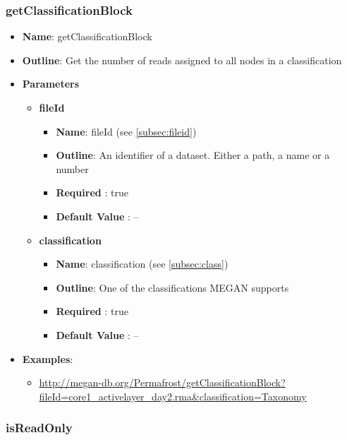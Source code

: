 \documentclass[11pt]{article}
\begin{document}
\subsubsection{getClassificationBlock}

\begin{itemize}
	\item \textbf{Name}: getClassificationBlock
	\item \textbf{Outline}: Get the number of reads assigned to all nodes in a classification
	\item \textbf{Parameters}
		\begin{itemize}
			\item \textbf{fileId}		
				\begin{itemize}
					\item \textbf{Name}: fileId (see \ref{subsec:fileid})
					\item \textbf{Outline}: An identifier of a dataset. Either a path, a name or a number
					\item \textbf{Required} : true
					\item \textbf{Default Value} : --
				\end{itemize}
			\item \textbf{classification}		
				\begin{itemize}
					\item \textbf{Name}: classification (see \ref{subsec:class})
					\item \textbf{Outline}: One of the classifications MEGAN supports
					\item \textbf{Required} : true
					\item \textbf{Default Value} : --
				\end{itemize}
		\end{itemize}
	\item \textbf{Examples}:
		\begin{itemize}		
			\item \url{http://megan-db.org/Permafrost/getClassificationBlock?fileId=core1_activelayer_day2.rma&classification=Taxonomy}
		\end{itemize}
\end{itemize}

\subsubsection{isReadOnly}
\end{document}
